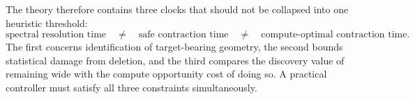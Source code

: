 \begin{remark}
The theory therefore contains three clocks that should not be collapsed into one heuristic threshold:
\[
\boxed{
\text{spectral resolution time}
\quad\neq\quad
\text{safe contraction time}
\quad\neq\quad
\text{compute-optimal contraction time}.}
\]
The first concerns identification of target-bearing geometry, the second bounds statistical damage from deletion, and the third compares the discovery value of remaining wide with the compute opportunity cost of doing so. A practical controller must satisfy all three constraints simultaneously.
\end{remark}
